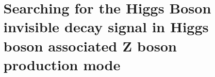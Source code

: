 \chapter{Searching for the Higgs Boson invisible decay signal in Higgs boson associated Z boson production mode}
